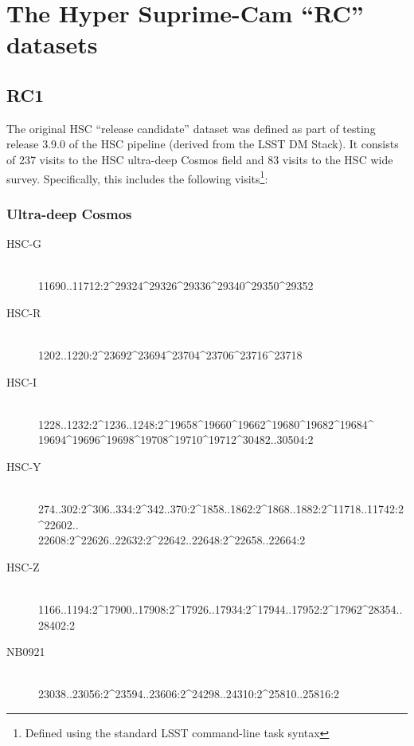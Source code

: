 \documentclass[DM,lsstdraft,STS,toc]{lsstdoc}
\begin{document}



\appendix

\section{The Hyper Suprime-Cam ``RC'' datasets}

\subsection{RC1}

The original HSC ``release candidate'' dataset was defined as part of testing
release 3.9.0 of the HSC pipeline (derived from the LSST DM Stack). It
consists of 237 visits to the HSC ultra-deep Cosmos field and 83 visits to the
HSC wide survey. Specifically, this includes the following
visits\footnote{Defined using the standard LSST command-line task syntax}:

\subsubsection{Ultra-deep Cosmos}
\label{sec:hscrc1}

\begin{description}

\item[HSC-G]{\hfill \\ 11690..11712:2\^{}29324\^{}29326\^{}29336\^{}29340\^{}29350\^{}29352}
\item[HSC-R]{\hfill \\ 1202..1220:2\^{}23692\^{}23694\^{}23704\^{}23706\^{}23716\^{}23718}
\item[HSC-I]{\hfill \\ 1228..1232:2\^{}1236..1248:2\^{}19658\^{}19660\^{}19662\^{}19680\^{}19682\^{}19684\^{}\\19694\^{}19696\^{}19698\^{}19708\^{}19710\^{}19712\^{}30482..30504:2}
\item[HSC-Y]{\hfill \\ 274..302:2\^{}306..334:2\^{}342..370:2\^{}1858..1862:2\^{}1868..1882:2\^{}11718..11742:2\^{}22602..\\22608:2\^{}22626..22632:2\^{}22642..22648:2\^{}22658..22664:2}
\item[HSC-Z]{\hfill \\ 1166..1194:2\^{}17900..17908:2\^{}17926..17934:2\^{}17944..17952:2\^{}17962\^{}28354..28402:2}
\item[NB0921]{\hfill \\ 23038..23056:2\^{}23594..23606:2\^{}24298..24310:2\^{}25810..25816:2}

\end{description}
\end{document}
